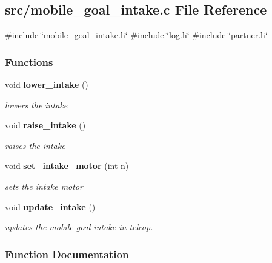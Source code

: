 \subsection{src/mobile\+\_\+goal\+\_\+intake.c File Reference}
\label{a00131}
{\ttfamily \#include \char`\"{}mobile\+\_\+goal\+\_\+intake.\+h\char`\"{}}\newline
{\ttfamily \#include \char`\"{}log.\+h\char`\"{}}\newline
{\ttfamily \#include \char`\"{}partner.\+h\char`\"{}}\newline
\subsubsection*{Functions}
\begin{DoxyCompactItemize}
\item 
void \textbf{ lower\+\_\+intake} ()
\begin{DoxyCompactList}\small\item\em lowers the intake \end{DoxyCompactList}\item 
void \textbf{ raise\+\_\+intake} ()
\begin{DoxyCompactList}\small\item\em raises the intake \end{DoxyCompactList}\item 
void \textbf{ set\+\_\+intake\+\_\+motor} (int n)
\begin{DoxyCompactList}\small\item\em sets the intake motor \end{DoxyCompactList}\item 
void \textbf{ update\+\_\+intake} ()
\begin{DoxyCompactList}\small\item\em updates the mobile goal intake in teleop. \end{DoxyCompactList}\end{DoxyCompactItemize}


\subsubsection{Function Documentation}
\mbox{\label{a00131_aef03134014e51a6a90dd3824f09f4d6c}} 
